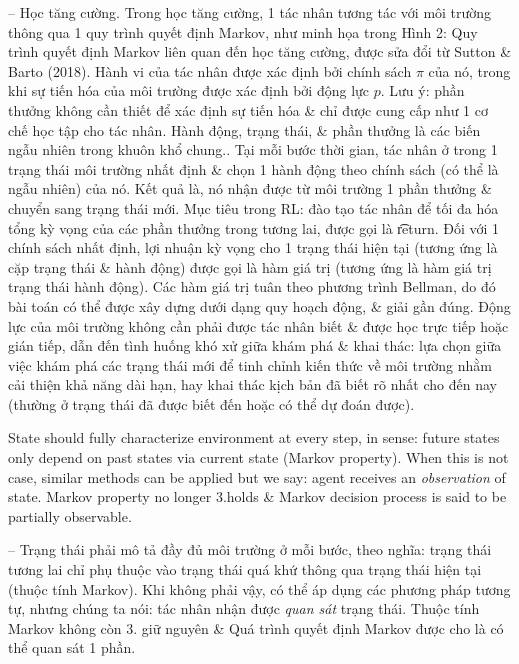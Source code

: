 \documentclass{article}
\begin{document}
\begin{itemize}
\begin{itemize}
\begin{itemize}
            -- {\sf Học tăng cường.} Trong học tăng cường, 1 tác nhân tương tác với môi trường thông qua 1 quy trình quyết định Markov, như minh họa trong {\sf Hình 2: Quy trình quyết định Markov liên quan đến học tăng cường, được sửa đổi từ Sutton \& Barto (2018). Hành vi của tác nhân được xác định bởi chính sách $\pi$ của nó, trong khi sự tiến hóa của môi trường được xác định bởi động lực $p$. Lưu ý: phần thưởng không cần thiết để xác định sự tiến hóa \& chỉ được cung cấp như 1 cơ chế học tập cho tác nhân. Hành động, trạng thái, \& phần thưởng là các biến ngẫu nhiên trong khuôn khổ chung.}. Tại mỗi bước thời gian, tác nhân ở trong 1 trạng thái môi trường nhất định \& chọn 1 hành động theo chính sách (có thể là ngẫu nhiên) của nó. Kết quả là, nó nhận được từ môi trường 1 phần thưởng \& chuyển sang trạng thái mới. Mục tiêu trong RL: đào tạo tác nhân để tối đa hóa tổng kỳ vọng của các phần thưởng trong tương lai, được gọi là {\t return}. Đối với 1 chính sách nhất định, lợi nhuận kỳ vọng cho 1 trạng thái hiện tại (tương ứng là cặp trạng thái \& hành động) được gọi là hàm giá trị (tương ứng là hàm giá trị trạng thái hành động). Các hàm giá trị tuân theo phương trình Bellman, do đó bài toán có thể được xây dựng dưới dạng quy hoạch động, \& giải gần đúng. Động lực của môi trường không cần phải được tác nhân biết \& được học trực tiếp hoặc gián tiếp, dẫn đến tình huống khó xử giữa khám phá \& khai thác: lựa chọn giữa việc khám phá các trạng thái mới để tinh chỉnh kiến thức về môi trường nhằm cải thiện khả năng dài hạn, hay khai thác kịch bản đã biết rõ nhất cho đến nay (thường ở trạng thái đã được biết đến hoặc có thể dự đoán được).

            State should fully characterize environment at every step, in sense: future states only depend on past states via current state (Markov property). When this is not case, similar methods can be applied but we say: agent receives an {\it observation} of state. Markov property no longer 3.holds \& Markov decision process is said to be partially observable.

            -- Trạng thái phải mô tả đầy đủ môi trường ở mỗi bước, theo nghĩa: trạng thái tương lai chỉ phụ thuộc vào trạng thái quá khứ thông qua trạng thái hiện tại (thuộc tính Markov). Khi không phải vậy, có thể áp dụng các phương pháp tương tự, nhưng chúng ta nói: tác nhân nhận được {\it quan sát} trạng thái. Thuộc tính Markov không còn 3. giữ nguyên \& Quá trình quyết định Markov được cho là có thể quan sát 1 phần.


\end{itemize}
\end{itemize}
\end{itemize}
\end{document}
